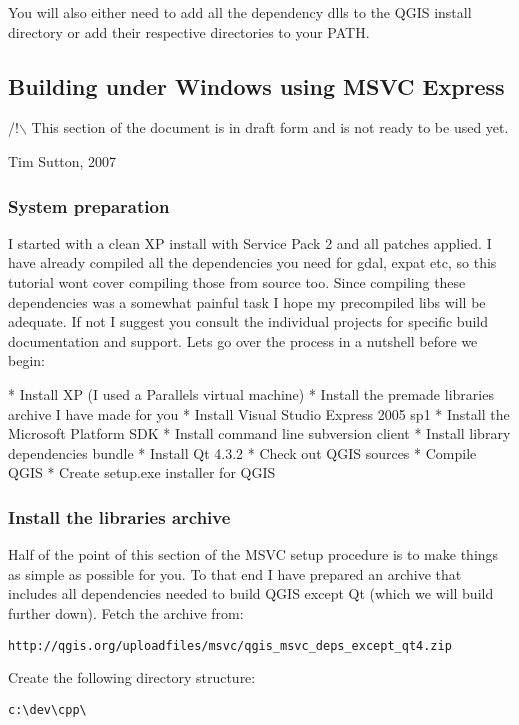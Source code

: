  You will also either need to add all the dependency dlls to the QGIS install directory or add their respective directories to your PATH.


\subsection{Building under Windows using MSVC Express}
/!$\backslash$ This section of the document is in draft form and is not ready to be used
yet.

Tim Sutton, 2007

\subsubsection{System preparation}
I started with a clean XP install with Service Pack 2 and all patches applied.
I have already compiled all the dependencies you need for gdal, expat etc,
so this tutorial wont cover compiling those from source too. Since compiling 
these dependencies was a somewhat painful task I hope my precompiled libs 
will be adequate. If not I suggest you consult the individual projects for
specific build documentation and support. Lets go over the process in a nutshell 
before we begin:

 * Install XP (I used a Parallels virtual machine)
 * Install the premade libraries archive I have made for you
 * Install Visual Studio Express 2005 sp1
 * Install the Microsoft Platform SDK
 * Install command line subversion client
 * Install library dependencies bundle
 * Install Qt 4.3.2
 * Check out QGIS sources
 * Compile QGIS
 * Create setup.exe installer for QGIS

\subsubsection{Install the libraries archive}
Half of the point of this section of the MSVC setup procedure is to make 
things as simple as possible for you. To that end I have prepared an
archive that includes all dependencies needed to build QGIS except Qt 
(which we will build further down). Fetch the archive from:

\begin{verbatim}
http://qgis.org/uploadfiles/msvc/qgis_msvc_deps_except_qt4.zip
\end{verbatim}

Create the following directory structure:

\begin{verbatim}
c:\dev\cpp\
\end{verbatim}

